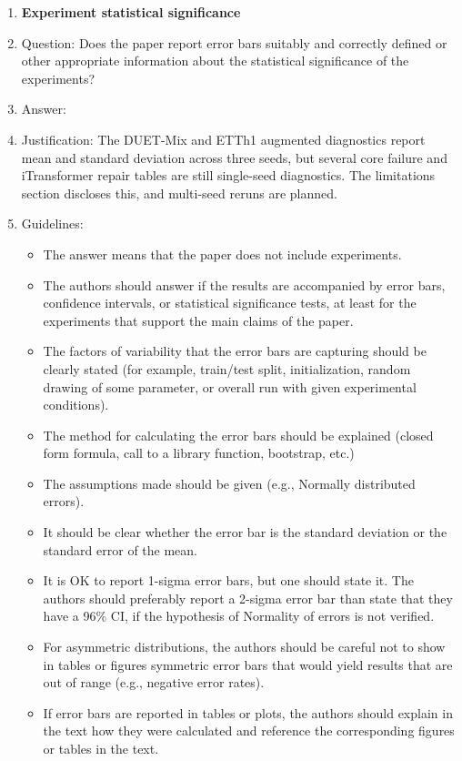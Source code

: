 \begin{enumerate}
\item {\bf Experiment statistical significance}
    \item[] Question: Does the paper report error bars suitably and correctly defined or other appropriate information about the statistical significance of the experiments?
    \item[] Answer: \answerNo{}
    \item[] Justification: The DUET-Mix and ETTh1 augmented diagnostics report mean and standard deviation across three seeds, but several core failure and iTransformer repair tables are still single-seed diagnostics. The limitations section discloses this, and multi-seed reruns are planned.
    \item[] Guidelines:
    \begin{itemize}
        \item The answer \answerNA{} means that the paper does not include experiments.
        \item The authors should answer \answerYes{} if the results are accompanied by error bars, confidence intervals, or statistical significance tests, at least for the experiments that support the main claims of the paper.
        \item The factors of variability that the error bars are capturing should be clearly stated (for example, train/test split, initialization, random drawing of some parameter, or overall run with given experimental conditions).
        \item The method for calculating the error bars should be explained (closed form formula, call to a library function, bootstrap, etc.)
        \item The assumptions made should be given (e.g., Normally distributed errors).
        \item It should be clear whether the error bar is the standard deviation or the standard error of the mean.
        \item It is OK to report 1-sigma error bars, but one should state it. The authors should preferably report a 2-sigma error bar than state that they have a 96\% CI, if the hypothesis of Normality of errors is not verified.
        \item For asymmetric distributions, the authors should be careful not to show in tables or figures symmetric error bars that would yield results that are out of range (e.g., negative error rates).
        \item If error bars are reported in tables or plots, the authors should explain in the text how they were calculated and reference the corresponding figures or tables in the text.
    \end{itemize}


\end{enumerate}
